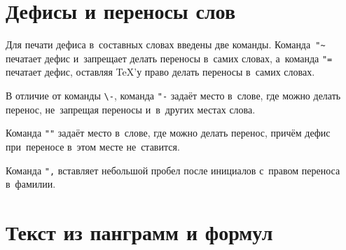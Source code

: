 \section{Дефисы и переносы слов}
Для печати дефиса в~составных словах введены две команды. Команда~\verb|"~| печатает дефис и~запрещает делать переносы в~самих словах, а~команда \verb|"=| печатает дефис, оставляя \TeX ’у право делать переносы в~самих словах.

В отличие от команды \verb|\-|, команда \verb|"-| задаёт место в~слове, где можно делать перенос, не~запрещая переносы и~в~других местах слова.

Команда \verb|""| задаёт место в~слове, где можно делать перенос, причём дефис при~переносе в~этом месте не~ставится.

Команда \verb|",| вставляет небольшой пробел после инициалов с~правом переноса в~фамилии.

\section{Текст из панграмм и формул}

